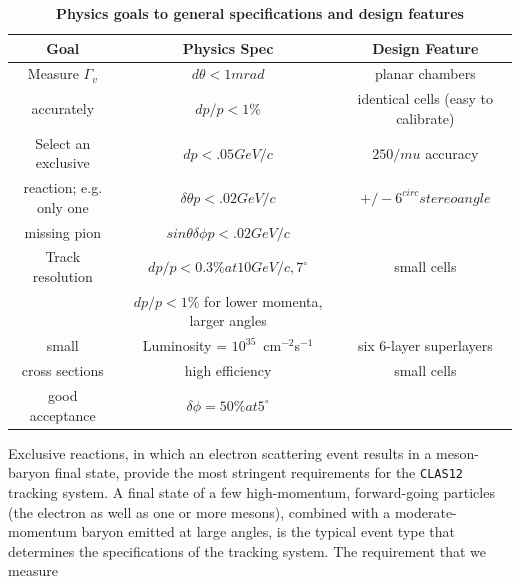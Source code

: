 \small{
\begin{table}[ht]
\begin{center}
\begin{tabular}{||c|c|c||} \hline \hline
   {\bf Goal}         & {\bf Physics Spec} & {\bf Design Feature}\\ \hline
Measure $\Gamma_v$  & $d \theta < 1mrad$   & planar chambers \\ 
accurately  & $dp/p < 1\% $ & identical cells (easy to calibrate)  \\ \hline
Select an exclusive  & $dp < .05 GeV/c$ & $250 /mu $ accuracy      \\ 
reaction; e.g. only one    & $\delta\theta p < .02 GeV/c$ &  $+/- 6^{circ} stereo angle $ \\ 
missing pion       & $sin\theta \delta \phi p < .02 GeV/c$ & \\ \hline
Track resolution       & $dp/p < 0.3\% at 10 GeV/c, 7^\circ$ & small cells \\ 
           & $dp/p < 1\%$ for lower momenta, larger angles &  \\ \hline
small       & Luminosity = $10^{35}$~cm$^{-2}$s$^{-1}$  & six 6-layer superlayers \\ 
cross sections  & high efficiency & small cells \\ \hline
good acceptance   & $\delta\phi = 50\% at 5^\circ$ & \\ \hline
\end{tabular}
\caption{\small{\bf Physics goals to general specifications and design features}}
\label{fwd-dc-physics-specifications}
\end{center}
\end{table}
}

Exclusive reactions, in which an electron scattering event 
results in a meson-baryon final state, provide the most 
stringent requirements for the {\tt CLAS12} tracking system. 
A final state 
of a few high-momentum, forward-going particles (the electron as well as one 
or more mesons), combined with a moderate-momentum baryon emitted at large 
angles, is the typical event type that determines the specifications of the 
tracking system.  The requirement that we measure


